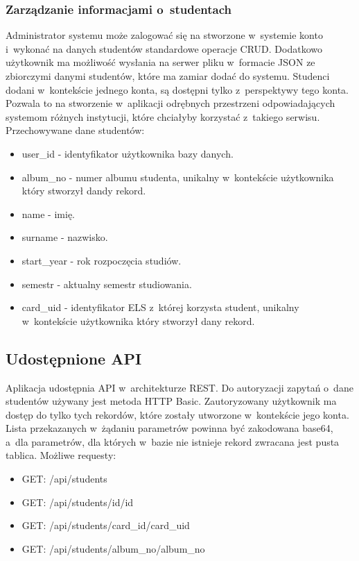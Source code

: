 \documentclass[declaration,shortabstract, mgr]{iithesis}
\begin{document}
\subsubsection{Zarządzanie informacjami o~studentach}
\indent Administrator systemu może zalogować się na stworzone w~systemie konto i~wykonać na danych studentów standardowe operacje CRUD. Dodatkowo użytkownik ma możliwość wysłania na serwer pliku w~formacie JSON ze zbiorczymi danymi studentów, które ma zamiar dodać do systemu. Studenci dodani w~kontekście jednego konta, są dostępni tylko z~perspektywy tego konta.
Pozwala to na stworzenie w~aplikacji odrębnych przestrzeni odpowiadających systemom różnych instytucji, które chciałyby korzystać z~takiego serwisu.\\
\indent Przechowywane dane studentów:
\begin{itemize}
\item user\_id - identyfikator użytkownika bazy danych.
\item album\_no - numer albumu studenta, unikalny w~kontekście użytkownika który stworzył dandy rekord.
\item name - imię.
\item surname - nazwisko.
\item start\_year - rok rozpoczęcia studiów.
\item semestr - aktualny semestr studiowania.
\item card\_uid - identyfikator ELS z~której korzysta student, unikalny w~kontekście użytkownika który stworzył dany rekord.
\end{itemize}
\subsection{Udostępnione API}
\indent Aplikacja udostępnia API w~architekturze REST\cite{rest}. Do autoryzacji zapytań o~dane studentów używany jest metoda HTTP Basic. Zautoryzowany użytkownik ma dostęp do tylko tych rekordów, które zostały utworzone w~kontekście jego konta.\\
\indent Lista przekazanych w~żądaniu parametrów powinna być zakodowana base64, a~dla parametrów, dla których w~bazie nie istnieje rekord zwracana jest pusta tablica.
\indent Możliwe requesty:
\begin{itemize}
\item GET: /api/students
\item GET: /api/students/id/{id}
\item GET: /api/students/card\_id/{card\_uid}
\item GET: /api/students/album\_no/{album\_no}
\end{itemize}
\end{document}
